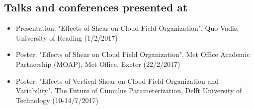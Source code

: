 \documentclass[11pt,a4paper]{article}
\begin{document}
\subsection*{Talks and conferences presented at}

\begin{itemize}
  \item Presentation: "Effects of Shear on Cloud Field Organization". Quo Vadis, University of Reading (1/2/2017)
  \item Poster: "Effects of Shear on Cloud Field Organization". Met Office Academic Partnership (MOAP), Met Office, Exeter (22/2/2017)
  \item Poster: "Effects of Vertical Shear on Cloud Field Organization and Variability". The Future of Cumulus Parameterization, Delft University of Technology (10-14/7/2017)
\end{itemize}
\end{document}
